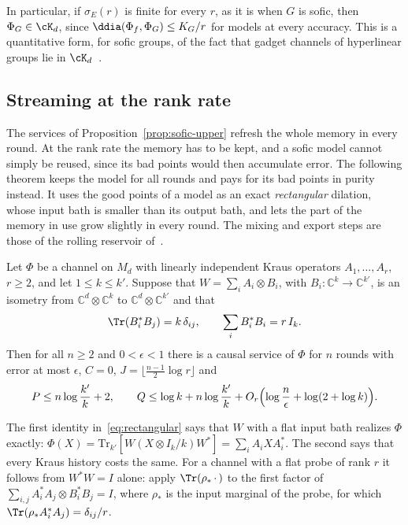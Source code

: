 In particular, if $\sigma_E(r)$ is finite for every $r$, as it is when $G$ is sofic, then $\Phi_G\in\cK_d$, since
$\ddia(\Phi_f,\Phi_G)\le K_G/r$ for models at every accuracy. This is a quantitative form, for sofic groups, of the fact that gadget channels of
hyperlinear groups lie in $\cK_d$~\cite{DouglasMghirbiB}.

\subsection{Streaming at the rank rate}\label{sec:streaming}

The services of Proposition~\ref{prop:sofic-upper} refresh the whole memory in every round. At the rank rate the memory has to be kept, and a sofic
model cannot simply be reused, since its bad points would then accumulate error. The following theorem keeps the model for all rounds and pays
for its bad points in purity instead. It uses the good points of a model as an exact \emph{rectangular} dilation, whose input bath is smaller than
its output bath, and lets the part of the memory in use grow slightly in every round. The mixing and export steps are those of the rolling
reservoir of~\cite[Appendix~A]{DouglasMghirbiB}.

\begin{theorem}\label{thm:streaming}
Let $\Phi$ be a channel on $M_d$ with linearly independent Kraus operators $A_1,\dots,A_r$, $r\ge2$, and let $1\le k\le k'$. Suppose that
$W=\sum_iA_i\otimes B_i$, with $B_i:\mathbb C^k\to\mathbb C^{k'}$, is an isometry from $\mathbb C^d\otimes\mathbb C^k$ to $\mathbb C^d\otimes\mathbb C^{k'}$ and that
\begin{equation}\label{eq:rectangular}
\Tr(B_i^*B_j)=k\,\delta_{ij},\qquad \sum_iB_i^*B_i=r\,I_k .
\end{equation}
Then for all $n\ge2$ and $0<\epsilon<1$ there is a causal service of $\Phi$ for $n$ rounds with error at most $\epsilon$, $C=0$,
$J=\lfloor\frac{n-1}2\log r\rfloor$ and
\[
P\le n\log\frac{k'}k+2,\qquad Q\le\log k+n\log\frac{k'}k+O_r\Bigl(\log\frac n\epsilon+\log(2+\log k)\Bigr).
\]
\end{theorem}

The first identity in~\eqref{eq:rectangular} says that $W$ with a flat input bath realizes $\Phi$ exactly:
$\Phi(X)=\mathrm{Tr}_{k'}[W(X\otimes I_k/k)W^*]=\sum_iA_iXA_i^*$. The second says that every Kraus history costs the same. For a channel with a
flat probe of rank $r$ it follows from $W^*W=I$ alone: apply $\Tr(\rho_*\,\cdot\,)$ to the first factor of $\sum_{i,j}A_i^*A_j\otimes B_i^*B_j=I$,
where $\rho_*$ is the input marginal of the probe, for which $\Tr(\rho_*A_i^*A_j)=\delta_{ij}/r$.

